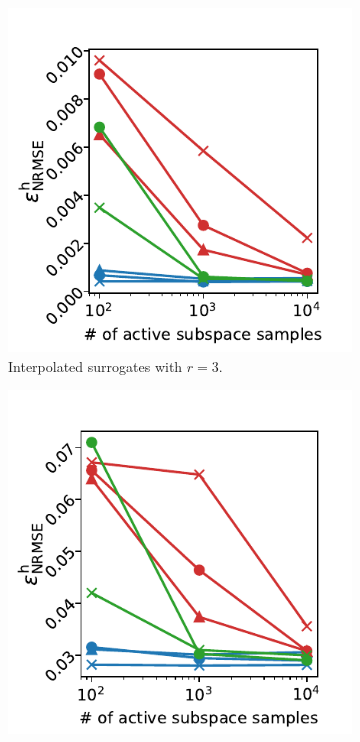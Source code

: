 \documentclass[
  a4paper,  %
  twoside,  %
  bibliography=totoc,
  headsepline,
  cleardoublepage=empty,
  parskip=half,
  draft=false
]{scrbook}
\begin{document}
\begin{mdframed}[style=style]
\begin{figure}[H]
\begin{subfigure}{.5\textwidth}
  \centering
   \includegraphics[width=\linewidth]{graphics/ishigami_as_3_inter}
	\caption{Interpolated surrogates with $r=3$.}
	\label{fig:ishigami_as_3_inter}
\end{subfigure}%
\begin{subfigure}{.5\textwidth}
  \centering
   \includegraphics[width=\linewidth]{graphics/ishigami_as_3}

\end{subfigure}
\end{figure}
\end{mdframed}
\end{document}
